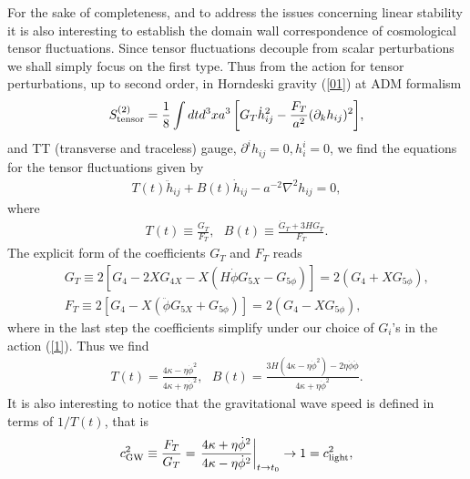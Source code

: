 \documentclass[aps,12pt, a4paper,nofootinbib]{revtex4}
\begin{document}
{For the sake of completeness, and to address the issues concerning linear stability it is also interesting to establish the domain wall correspondence of cosmological tensor fluctuations. Since tensor fluctuations decouple from scalar perturbations we shall simply focus on the first type. Thus from the action for tensor perturbations, up to second order, in Horndeski gravity (\ref{01}) at ADM formalism
\begin{eqnarray}
S^{(2)}_{\rm tensor}=\frac18\int{dtd^3xa^3\left[G_T \dot{h}_{ij}^2-\frac{F_T}{a^2}(\partial_k h_{ij})^2\right]},
\end{eqnarray}
and TT (transverse and traceless) gauge, $\partial^i h_{ij}=0, h_i^i=0$, we find the equations for the tensor fluctuations given by
\begin{eqnarray}
T(t)\ddot h_{ij}+B(t)\dot{h}_{ij}-a^{-2}\nabla^2 h_{ij}=0,\label{T1}
\end{eqnarray}
where
\begin{eqnarray}
T(t)\equiv\frac{G_T}{F_T}, \:\:\: B(t)\equiv\frac{\dot{G}_T+3HG_T}{F_T}.
\end{eqnarray}
The explicit form of the coefficients $G_T$ and $F_T$ reads \cite{Kob}
\begin{eqnarray}
&& G_T\equiv 2\left[G_4-2XG_{4X}-X\left(H\dot\phi G_{5X}-G_{5\phi}\right)\right]=2\left(G_4+X G_{5\phi}\right),\\
&& F_T\equiv 2\left[G_4-X\left(\ddot\phi G_{5X}+G_{5\phi}\right)\right]=2\left(G_4-X G_{5\phi}\right),
\end{eqnarray}
where in the last step the coefficients simplify under our choice of $G_i$'s in the action (\ref{1}). Thus we find
\begin{eqnarray}
T(t)=\frac{4\kappa-\eta\dot{\phi}^2}{4\kappa+\eta\dot{\phi}^2}, \:\:\: B(t)=\frac{3H(4\kappa-\eta\dot{\phi}^2)-2\eta\dot{\phi}\ddot{\phi}}{4\kappa+\eta\dot{\phi}^2}.
\end{eqnarray}
It is also interesting to notice that the gravitational wave speed is defined in terms of $1/T(t)$, that is
\begin{eqnarray}
c_{\rm GW}^2\equiv\frac{F_T}{G_T}=\left.\frac{4\kappa+\eta\dot{\phi}^2}{4\kappa-\eta\dot{\phi}^2}\right|_{t\to t_0}\to1=c_{\rm light}^2,\label{light}
\end{eqnarray}
}
\end{document}
